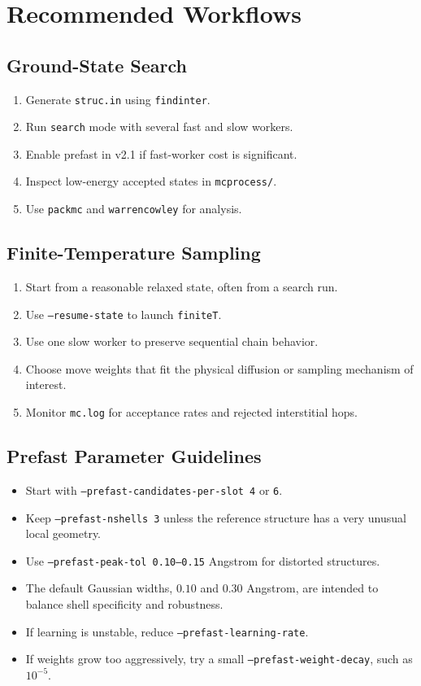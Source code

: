 \documentclass[11pt]{article}
\begin{document}
\section{Recommended Workflows}

\subsection{Ground-State Search}

\begin{enumerate}
  \item Generate \texttt{struc.in} using \texttt{findinter}.
  \item Run \texttt{search} mode with several fast and slow workers.
  \item Enable prefast in v2.1 if fast-worker cost is significant.
  \item Inspect low-energy accepted states in \texttt{mcprocess/}.
  \item Use \texttt{packmc} and \texttt{warrencowley} for analysis.
\end{enumerate}

\subsection{Finite-Temperature Sampling}

\begin{enumerate}
  \item Start from a reasonable relaxed state, often from a search run.
  \item Use \texttt{--resume-state} to launch \texttt{finiteT}.
  \item Use one slow worker to preserve sequential chain behavior.
  \item Choose move weights that fit the physical diffusion or sampling mechanism of interest.
  \item Monitor \texttt{mc.log} for acceptance rates and rejected interstitial hops.
\end{enumerate}

\subsection{Prefast Parameter Guidelines}

\begin{itemize}
  \item Start with \texttt{--prefast-candidates-per-slot 4} or \texttt{6}.
  \item Keep \texttt{--prefast-nshells 3} unless the reference structure has a very unusual local geometry.
  \item Use \texttt{--prefast-peak-tol 0.10--0.15} Angstrom for distorted structures.
  \item The default Gaussian widths, $0.10$ and $0.30$ Angstrom, are intended to balance shell specificity and robustness.
  \item If learning is unstable, reduce \texttt{--prefast-learning-rate}.
  \item If weights grow too aggressively, try a small \texttt{--prefast-weight-decay}, such as $10^{-5}$.
\end{itemize}
\end{document}

